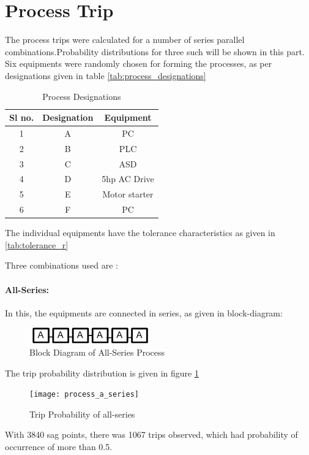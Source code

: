 \documentclass[17pt,a4paper]{extreport}
\begin{document}
\newpage \section[Process Trip]{Process Trip} The process trips were calculated for a number of series parallel combinations.Probability distributions for three such will be shown in this part. Six equipments were randomly chosen for forming the processes, as per designations given in table \ref{tab:process_designations}

\begin{table}[!h]
\centering
\caption{Process Designations}
\begin{tabular}{|c|c|c|}
\hline 
Sl no. & Designation & Equipment\\
\hline
1 & A & PC \\
\hline
2 & B & PLC\\
\hline
3 & C & ASD\\
\hline
4 & D & 5hp AC Drive\\
\hline
5 & E & Motor starter\\
\hline
6 & F & PC\\
\hline

\end{tabular}
\label{process_designations}
\end{table}


The individual equipments have the tolerance characteristics as given in \ref{tab:tolerance_r}

Three combinations used are :
\paragraph{All-Series:} In this, the equipments are connected in series, as given in block-diagram:

\begin{figure}[!h]
\centering
\includegraphics[scale=1]{Drawing6(1).png}
\caption{Block Diagram of All-Series Process}
\end{figure}

The trip probability distribution is given in figure \ref{fig:all-series}


\begin{figure}[!h]
\texttt{[image: process\_a\_series]}
\caption{Trip Probability of all-series}
\label{fig:all-series}
\end{figure}
With 3840 sag points, there was 1067 trips observed, which had probability of occurrence of more than 0.5. 
\end{document}
